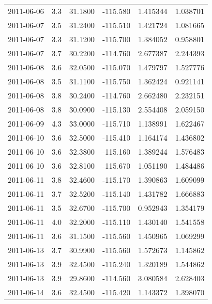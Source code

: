 \begin{tabular}{lrrrrr}
2011-06-06 &       3.3 &  31.1800 &  -115.580 &         1.415344 &         1.038701 \\
2011-06-07 &       3.5 &  31.2400 &  -115.510 &         1.421724 &         1.081665 \\
2011-06-07 &       3.3 &  31.1200 &  -115.700 &         1.384052 &         0.958801 \\
2011-06-07 &       3.7 &  30.2200 &  -114.760 &         2.677387 &         2.244393 \\
2011-06-08 &       3.6 &  32.0500 &  -115.070 &         1.479797 &         1.527776 \\
2011-06-08 &       3.5 &  31.1100 &  -115.750 &         1.362424 &         0.921141 \\
2011-06-08 &       3.8 &  30.2400 &  -114.760 &         2.662480 &         2.232151 \\
2011-06-08 &       3.8 &  30.0900 &  -115.130 &         2.554408 &         2.059150 \\
2011-06-09 &       4.3 &  33.0000 &  -115.710 &         1.138991 &         1.622467 \\
2011-06-10 &       3.6 &  32.5000 &  -115.410 &         1.164174 &         1.436802 \\
2011-06-10 &       3.6 &  32.3800 &  -115.160 &         1.389244 &         1.576483 \\
2011-06-10 &       3.6 &  32.8100 &  -115.670 &         1.051190 &         1.484486 \\
2011-06-11 &       3.8 &  32.4600 &  -115.170 &         1.390863 &         1.609099 \\
2011-06-11 &       3.7 &  32.5200 &  -115.140 &         1.431782 &         1.666883 \\
2011-06-11 &       3.5 &  32.6700 &  -115.700 &         0.952943 &         1.354179 \\
2011-06-11 &       4.0 &  32.2000 &  -115.110 &         1.430140 &         1.541558 \\
2011-06-11 &       3.6 &  31.1500 &  -115.560 &         1.450965 &         1.069299 \\
2011-06-13 &       3.7 &  30.9900 &  -115.560 &         1.572673 &         1.145862 \\
2011-06-13 &       3.9 &  32.4500 &  -115.240 &         1.320189 &         1.544862 \\
2011-06-13 &       3.9 &  29.8600 &  -114.560 &         3.080584 &         2.628403 \\
2011-06-14 &       3.6 &  32.4500 &  -115.420 &         1.143372 &         1.398070 \\

\end{tabular}
